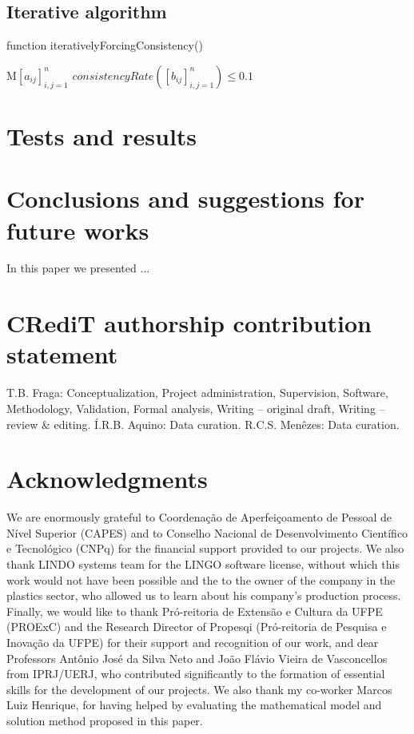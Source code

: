 \documentclass[authoryear,manuscript,12pt]{elsarticle}
\begin{document}
\subsection{Iterative algorithm}

\begin{algorithm}
\caption{function iterativelyForcingConsistency()}\label{alg:CA}
\begin{algorithmic}
\Require $\textrm{M}[a_{ij}]_{i,j=1}^{n}$
\Ensure $consistencyRate([b_{ij}]_{i,j=1}^{n}) \leq 0.1$

\end{algorithmic}
\end{algorithm}

\section{Tests and results}
\label{sec:results}



\section{Conclusions and suggestions for future works}
\label{sec:conclusions}

In this paper we presented ...

\section{CRediT authorship contribution statement} 
\label{sec:contributions}

T.B. Fraga: Conceptualization, Project administration, Supervision, Software, Methodology, Validation, Formal analysis, Writing – original draft, Writing – review \& editing. Í.R.B. Aquino: Data curation. R.C.S. Menêzes: Data curation.

\section{Acknowledgments}
\label{sec:acknowledgments}

We are enormously grateful to Coordenação de Aperfeiçoamento de Pessoal de Nível Superior (CAPES) and to Conselho Nacional de Desenvolvimento Científico e Tecnológico (CNPq) for the financial support provided to our projects. We also thank LINDO systems team for the LINGO software license, without which this work would not have been possible and the to the owner of the company in the plastics sector, who allowed us to learn about his company's production process. Finally, we would like to thank Pró-reitoria de Extensão e Cultura da UFPE (PROExC) and the Research Director of Propesqi (Pró-reitoria de Pesquisa e Inovação da UFPE) for their support and recognition of our work, and dear Professors Antônio José da Silva Neto and João Flávio Vieira de Vasconcellos from IPRJ/UERJ, who contributed significantly to the formation of essential skills for the development of our projects. We also thank my co-worker Marcos Luiz Henrique, for having helped by evaluating the mathematical model and solution method proposed in this paper.
\end{document}
